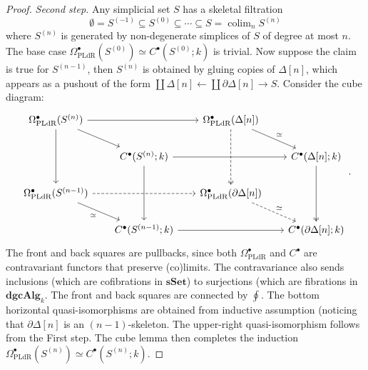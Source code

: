 \documentclass[psamsfonts]{amsart}
\theoremstyle{definition}
\theoremstyle{remark}
\newcommand{\dgcAlg}{\mathbf{dgcAlg}}
\newcommand{\sSet}{\mathbf{sSet}}
\DeclareMathOperator*\colim{colim}
\numberwithin{equation}{section}
\begin{document}
\begin{proof}
\textit{Second step.}
Any simplicial set $S$ has a skeletal filtration
\[\emptyset=S^{(-1)}\subseteq S^{(0)}\subseteq\cdots\subseteq S=\textstyle{\colim_nS^{(n)}}\]
where $S^{(n)}$ is generated by non-degenerate simplices of $S$ of degree at most $n$. The base case $\Omega^\bullet_\textrm{PLdR}(S^{(0)})\simeq C^\bullet(S^{(0)};k)$ is trivial. Now suppose the claim is true for $S^{(n-1)}$, then $S^{(n)}$ is obtained by gluing copies of $\Delta[n]$, which appears as a pushout of the form $\coprod\Delta[n]\leftarrow\coprod\partial\Delta[n]\rightarrow S$. Consider the cube diagram:
\[\begin{tikzcd}[column sep=scriptsize]
\Omega^\bullet_\textrm{PLdR}(S^{(n)})\arrow[dd]\arrow[dr]\arrow[rr]&&\Omega^\bullet_\textrm{PLdR}(\Delta[n])\arrow[dd,dashed,two heads]\arrow[dr,"\simeq"]\\
&C^\bullet(S^{(n)};k)\arrow[dd]\arrow[rr]&&C^\bullet(\Delta[n];k)\arrow[dd,two heads]\\
\Omega^\bullet_\textrm{PLdR}(S^{(n-1)})\arrow[dr,"\simeq"']\arrow[rr,dashed]&&\Omega^\bullet_\textrm{PLdR}(\partial\Delta[n])\arrow[dr,dashed,"\simeq"]\\
&C^\bullet(S^{(n-1)};k)\arrow[rr]&&C^\bullet(\partial\Delta[n];k)
\end{tikzcd}.\]
The front and back squares are pullbacks, since both $\Omega^\bullet_\textrm{PLdR}$ and $C^\bullet$ are contravariant functors that preserve (co)limits. The contravariance also sends inclusions (which are cofibrations in $\sSet$) to surjections (which are fibrations in $\dgcAlg_k$. The front and back squares are connected by $\oint$. The bottom horizontal quasi-isomorphisms are obtained from inductive assumption (noticing that $\partial\Delta[n]$ is an $(n-1)$-skeleton. The upper-right quasi-isomorphism follows from the First step. The cube lemma then completes the induction $\Omega^\bullet_\textrm{PLdR}(S^{(n)})\simeq C^\bullet(S^{(n)};k)$.
\end{proof}
\end{document}

